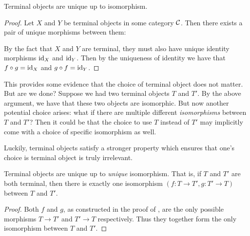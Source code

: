 \begin{theorem} \label{thm:terminal-object-unique}
  Terminal objects are unique up to isomorphism.
\end{theorem}
\begin{proof}
  Let $X$ and $Y$ be terminal objects in some category $\mathcal C$. 
  Then there exists a pair of unique morphisms between them:

  \begin{center}
\end{center}
By the fact that $X$ and $Y$ are terminal, they must also have unique identity
morphisms $\operatorname{id}_X$ and $\operatorname{id}_Y$. Then by the uniqueness of identity we have that $f \circ g = \operatorname{id}_X$ and $g \circ f = \operatorname{id}_Y$.
\end{proof}

This provides some evidence that the choice of terminal object does not matter.
  But are we done? Suppose we had two terminal objects \(T\) and \(T'\).
  By the above argument, we have that these two objects are isomorphic.
  But now another potential choice arises: what if there are multiple different
  \emph{isomorphisms} between \(T\) and \(T'\)?
  Then it could be that the choice to use \(T\) instead of \(T'\)
  may implicitly come with a choice of specific isomorphism as well.

  Luckily, terminal objects satisfy a stronger property
  which ensures that one's choice is terminal object is truly irrelevant.

\begin{proposition}
  Terminal objects are unique up to \emph{unique} isomorphism.
  That is, if \(T\) and \(T'\) are both terminal,
  then there is exactly one isomorphism
  \((f:T\to T',g:T'\to T)\)
  between \(T\) and \(T'\).
\end{proposition}
\begin{proof}
  Both \(f\) and \(g\), as constructed in the proof of
  ,
  are the only possible morphisms \(T \to T'\) and \(T'\to T\)
  respectively. Thus they together form the only isomorphism
  between \(T\) and \(T'\).
\end{proof}

